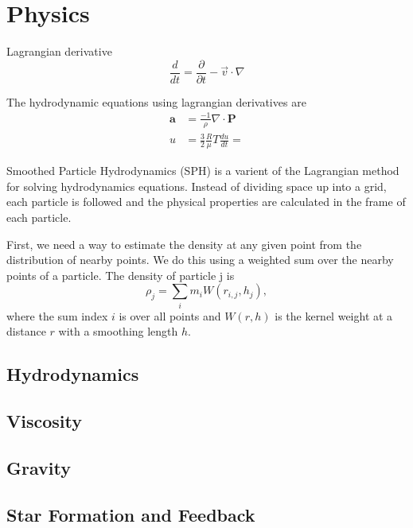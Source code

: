 \documentclass[12pt]{article}
\begin{document}
\section{Physics}
Lagrangian derivative
\begin{equation}
    \frac{d}{dt} = \frac{\partial }{\partial t} - \vec{v} \cdot \nabla 
\end{equation}

The hydrodynamic equations using lagrangian derivatives are
\begin{align}
    \mathbf{a} &= \frac{-1}{\rho} \nabla \cdot \mathbf{P} \\
    u &= \frac{3}{2} \frac{R}{\mu} T
    \frac{d u}{d t} = 
\end{align}

Smoothed Particle Hydrodynamics (SPH) is a varient of the Lagrangian method for solving
hydrodynamics equations. Instead of dividing space up into a grid, each particle is followed and the physical properties are calculated in the frame of each particle.

First, we need a way to estimate the density at any given point from the distribution of nearby points. We do this using a weighted sum over the nearby points of a particle. The density of particle j is
\begin{equation}
    \rho_j = \sum_{i} m_i W(r_{i,j}, h_j),
\end{equation}
where the sum index $i$ is over all points and $W(r, h)$ is the kernel weight at a distance $r$ with a smoothing length $h$. 

\subsection{Hydrodynamics}

\subsection{Viscosity}


\subsection{Gravity}


\subsection{Star Formation and Feedback}
\end{document}

